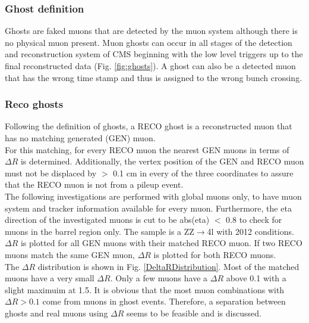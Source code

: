 \subsubsection{Ghost definition}
Ghosts are faked muons that are detected by the muon system although there is no physical muon present.
Muon ghosts can occur in all stages of the detection and reconstruction system of CMS beginning with the low level triggers up to the final reconstructed data (Fig. \ref{fig:ghosts}).
A ghost can also be a detected muon that has the wrong time stamp and thus is assigned to the wrong bunch crossing.

\subsubsection{Reco ghosts}
Following the definition of ghosts, a RECO ghost is a reconstructed muon that has no matching generated (GEN) muon.\\
For this matching, for every RECO muon the nearest GEN muons in terms of $\Delta R$ is determined. Additionally, the vertex position of the GEN and RECO muon must not be displaced by $>$ 0.1 cm in every of the three coordinates to assure that the RECO muon is not from a pileup event.\\
The following investigations are performed with global muons only, to have muon system and tracker information available for every muon. Furthermore, the eta direction of the investigated muons is cut to be abs(eta) $<$ 0.8 to check for muons in the barrel region only. The sample is a ZZ$\to$4l with 2012 conditions.\\
$\Delta R$ is plotted for all GEN muons with their matched RECO muon. If two RECO muons match the same GEN muon, $\Delta R$ is plotted for both RECO muons.\\
The $\Delta R$ distribution is shown in Fig. \ref{DeltaRDistribution}. Most of the matched muons have a very small $\Delta R$. Only a few muons have a $\Delta R$ above 0.1 with a slight maximuim at 1.5. It is obvious that the most muon combinations with $\Delta R > 0.1$ come from muons in ghost events. Therefore, a separation between ghosts and real muons using $\Delta R$ seems to be feasible and is discussed.\\
